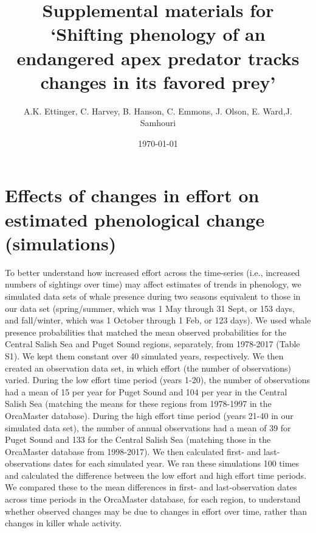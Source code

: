 \documentclass{article}
\begin{document}



\title{Supplemental materials for `Shifting phenology of an endangered apex predator tracks changes in its favored prey'}
\date{\today}
\maketitle
\author{A.K. Ettinger, C. Harvey, B. Hanson, C. Emmons, J. Olson, E. Ward,J. Samhouri}
\renewcommand{\thetable}{S\arabic{table}}
\renewcommand{\thefigure}{S\arabic{figure}}

\section* {Effects of changes in effort on estimated phenological change (simulations)}
To better understand how increased effort across the time-series (i.e., increased numbers of sightings over time) may affect estimates of trends in phenology, we simulated data sets of whale presence during two seasons equivalent to those in our data set (spring/summer, which was 1 May through 31 Sept, or 153 days, and fall/winter, which was 1 October through 1 Feb, or 123 days). We used whale presence probabilities that matched the mean observed probabilities for the Central Salish Sea and Puget Sound regions, separately, from 1978-2017 (Table S1). We kept them constant over 40 simulated years, respectively. We then created an observation data set, in which effort (the number of observations) varied. During the low effort time period (years 1-20), the number of observations had a mean of 15 per year for Puget Sound and 104 per year in the Central Salish Sea (matching the means for these regions from 1978-1997 in the OrcaMaster database). During the high effort time period (years 21-40 in our simulated data set), the number of annual observations had a mean of 39 for Puget Sound and 133 for the Central Salish Sea (matching those in the OrcaMaster database from 1998-2017). We then calculated first- and last- observations dates for each simulated year. We ran these simulations 100 times and calculated the difference between the low effort and high effort time periods. We compared these to the mean differences in first- and last-observation dates across time periods in the OrcaMaster database, for each region, to understand whether observed changes may be due to changes in effort over time, rather than changes in killer whale activity. 
\end{document}
